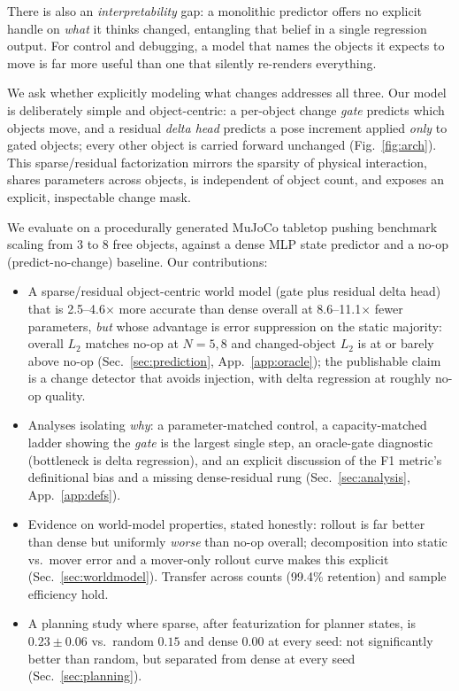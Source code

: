 \documentclass[conference]{IEEEtran}
\begin{document}
There is also an \emph{interpretability} gap: a monolithic predictor offers no explicit
handle on \emph{what} it thinks changed, entangling that belief in a single regression
output. For control and debugging, a model that names the objects it expects to move is
far more useful than one that silently re-renders everything.

We ask whether explicitly modeling what changes addresses all three. Our model is
deliberately simple and object-centric: a per-object change \emph{gate} predicts
which objects move, and a residual \emph{delta head} predicts a pose increment
applied \emph{only} to gated objects; every other object is carried forward
unchanged (Fig.~\ref{fig:arch}). This sparse/residual factorization mirrors the
sparsity of physical interaction, shares parameters across objects, is independent
of object count, and exposes an explicit, inspectable change mask.

We evaluate on a procedurally generated MuJoCo tabletop pushing benchmark scaling
from 3 to 8 free objects, against a dense MLP state
predictor and a no-op (predict-no-change) baseline. Our contributions:
\begin{itemize}
  \item A sparse/residual object-centric world model (gate plus residual delta head)
  that is 2.5--4.6$\times$ more accurate than dense overall at 8.6--11.1$\times$
  fewer parameters, \emph{but} whose advantage is error suppression on the static
  majority: overall $L_2$ matches no-op at $N{=}5,8$ and changed-object $L_2$ is at
  or barely above no-op (Sec.~\ref{sec:prediction}, App.~\ref{app:oracle}); the
  publishable claim is a change detector that avoids injection, with delta regression
  at roughly no-op quality.
  \item Analyses isolating \emph{why}: a parameter-matched control, a
  capacity-matched ladder showing the \emph{gate} is the largest single step, an
  oracle-gate diagnostic (bottleneck is delta regression), and an explicit discussion
  of the F1 metric's definitional bias and a missing dense-residual rung
  (Sec.~\ref{sec:analysis}, App.~\ref{app:defs}).
  \item Evidence on world-model properties, stated honestly: rollout is far better
  than dense but uniformly \emph{worse} than no-op overall; decomposition into
  static vs.\ mover error and a mover-only rollout curve makes this explicit
  (Sec.~\ref{sec:worldmodel}). Transfer across counts (99.4\% retention) and sample
  efficiency hold.
  \item A planning study where sparse, after featurization for planner states, is
  $0.23\pm0.06$ vs.\ random $0.15$ and dense $0.00$ at every seed: not significantly
  better than random, but separated from dense at every seed
  (Sec.~\ref{sec:planning}).
\end{itemize}
\end{document}
